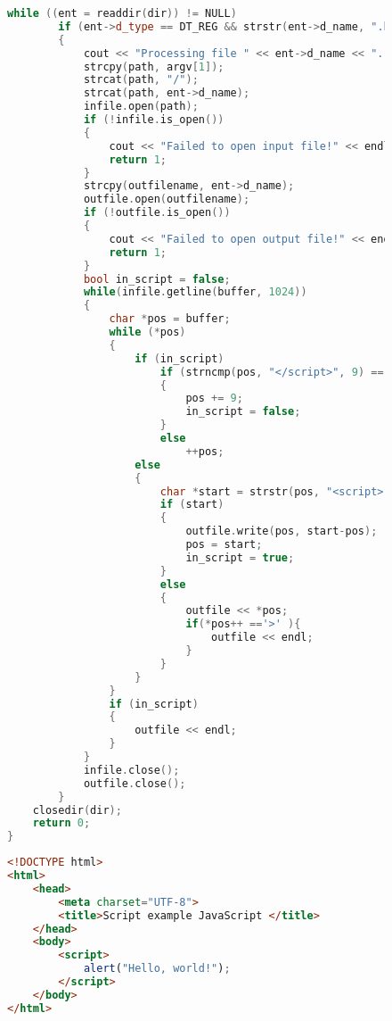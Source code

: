 \documentclass[a4paper, 14pt]{extarticle}
\begin{document}
\begin{figure}[!htb]
\begin{lstlisting}[language={c++},caption={main.cpp},label={lst:code2}]
    while ((ent = readdir(dir)) != NULL)
        if (ent->d_type == DT_REG && strstr(ent->d_name, ".html"))
        {
            cout << "Processing file " << ent->d_name << "..." << endl;
            strcpy(path, argv[1]);
            strcat(path, "/");
            strcat(path, ent->d_name);
            infile.open(path);
            if (!infile.is_open())
            {
                cout << "Failed to open input file!" << endl;
                return 1;
            }
            strcpy(outfilename, ent->d_name);
            outfile.open(outfilename);
            if (!outfile.is_open())
            {
                cout << "Failed to open output file!" << endl;
                return 1;
            }
            bool in_script = false;
            while(infile.getline(buffer, 1024))
            {
                char *pos = buffer;
                while (*pos)
                {
                    if (in_script)
                        if (strncmp(pos, "</script>", 9) == 0)
                        {
                            pos += 9;
                            in_script = false;
                        }
                        else
                            ++pos;
                    else
                    {
                        char *start = strstr(pos, "<script>");
                        if (start)
                        {
                            outfile.write(pos, start-pos);
                            pos = start;
                            in_script = true;
                        }
                        else
                        {
                            outfile << *pos;
                            if(*pos++ =='>' ){
                            	outfile << endl;
                            }
                        }
                    }
                }
                if (in_script)
                {
                    outfile << endl;
                }
            }
            infile.close();
            outfile.close();
        }
    closedir(dir);
    return 0;
}
\end{lstlisting}
\end{figure}

\begin{figure}[!htb]
\begin{lstlisting}[language={html},caption={Один из html файлов},label={lst:code3}]
<!DOCTYPE html>
<html>
    <head>
        <meta charset="UTF-8">
        <title>Script example JavaScript </title>
    </head>
    <body>
        <script>
            alert("Hello, world!");
        </script>
    </body>
</html>
\end{lstlisting}
\end{figure}
\end{document}
